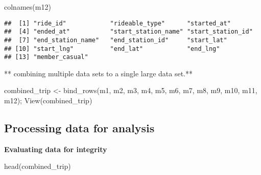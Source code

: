 \documentclass[
]{article}
\newenvironment{Shaded}{\begin{snugshade}}{\end{snugshade}}
\newcommand{\FunctionTok}[1]{\textcolor[rgb]{0.00,0.00,0.00}{#1}}
\newcommand{\NormalTok}[1]{#1}
\newcommand{\OtherTok}[1]{\textcolor[rgb]{0.56,0.35,0.01}{#1}}
\begin{document}
\begin{Shaded}
\begin{Highlighting}[]
\FunctionTok{colnames}\NormalTok{(m12)}
\end{Highlighting}
\end{Shaded}

\begin{verbatim}
##  [1] "ride_id"            "rideable_type"      "started_at"        
##  [4] "ended_at"           "start_station_name" "start_station_id"  
##  [7] "end_station_name"   "end_station_id"     "start_lat"         
## [10] "start_lng"          "end_lat"            "end_lng"           
## [13] "member_casual"
\end{verbatim}

** combining multiple data sets to a single large data set.**

\begin{Shaded}
\begin{Highlighting}[]
\NormalTok{combined\_trip }\OtherTok{\textless{}{-}} \FunctionTok{bind\_rows}\NormalTok{(m1, m2, m3, m4, m5, m6, m7, m8, m9, m10, m11, m12);}
\FunctionTok{View}\NormalTok{(combined\_trip)}
\end{Highlighting}
\end{Shaded}

\hypertarget{processing-data-for-analysis}{%
\subsection{Processing data for
analysis}\label{processing-data-for-analysis}}

\textbf{Evaluating data for integrity}

\begin{Shaded}
\begin{Highlighting}[]
\FunctionTok{head}\NormalTok{(combined\_trip)}
\end{Highlighting}
\end{Shaded}
\end{document}

